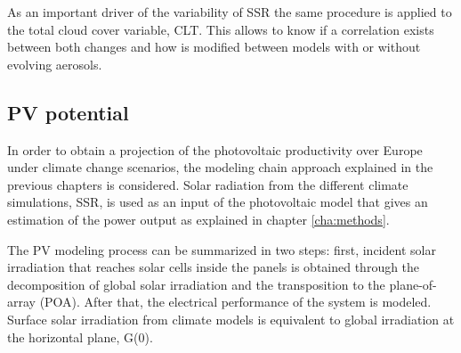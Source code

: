 As an important driver of the variability of SSR the same procedure is applied to the total cloud cover variable, CLT. This allows to know if a correlation exists between both changes and how is modified between models with or without evolving aerosols.





\subsection{PV potential}

In order to obtain a projection of the photovoltaic productivity over Europe under climate change scenarios, the modeling chain approach explained in the previous chapters is considered. Solar radiation from the different climate simulations, SSR, is used as an input of the photovoltaic model that gives an estimation of the power output as explained in chapter \ref{cha:methods}.


The PV modeling process can be summarized in two steps: first, incident solar irradiation that reaches solar cells inside the panels is obtained through the decomposition of global solar irradiation and the transposition to the plane-of-array (POA). After that, the electrical performance of the system is modeled. Surface solar irradiation from climate models is equivalent to global irradiation at the horizontal plane, G(0).

